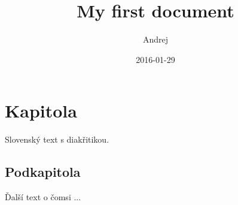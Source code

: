 \documentclass{article}
\title{My first document}
\date{2016-01-29}
\author{Andrej \sktxt{Šišila}}
\newcommand\sktxt[1]{\foreignlanguage{slovak}{#1}}
\begin{document}
\maketitle
{}
\newpage
{}

\section{Kapitola}
\sktxt{ Slovenský text s diakřitikou. }

\subsection{Podkapitola}
\sktxt{Ďalší text o čomsi ...}
\end{document}
